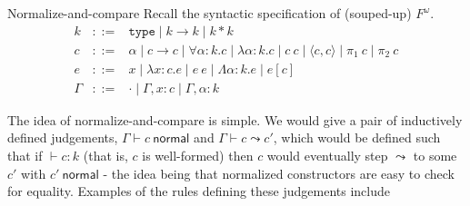 \documentclass{amsart}
\newcommand{\type}{\ensuremath{\mathtt{type}}}
\begin{document}
\begin{section}{Normalize-and-compare}
    \newcommand{\normal}[1]{#1 \ \mathsf{normal}}
    Recall the syntactic specification of (souped-up) $F^\omega$.
    \[
      \begin{array}{lcl}
        k & ::= & \type \mid k \to k \mid k * k\\
        c & ::= & \alpha \mid c \to c \mid \forall \alpha : k. c
            \mid \lambda \alpha : k. c \mid c\ c \mid \langle c, c \rangle \mid \pi_1 \ c \mid \pi_2 \ c \\
        e & ::= & x \mid \lambda x : c. e \mid e\ e \mid
                \Lambda \alpha : k. e \mid e[c]\\
        \Gamma & ::= & \cdot \mid \Gamma, x : c \mid \Gamma, \alpha : k
      \end{array}
    \]

    The idea of normalize-and-compare is simple. We would give a pair of inductively defined judgements, $\Gamma \vdash \normal{c}$ and $\Gamma \vdash c \leadsto c'$, which would be defined such that if $\vdash c : k$ (that is, $c$ is well-formed) then $c$ would eventually step $\leadsto$ to some $c'$ with $\normal{c'}$ - the idea being that normalized constructors are easy to check for equality. Examples of the rules defining these judgements include


\end{section}
\end{document}
